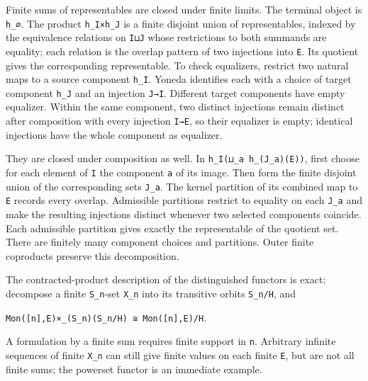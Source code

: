 \documentclass[
  10pt,
]{article}
\begin{document}
Finite sums of representables are closed under finite limits. The
terminal object is \texttt{\small h\_\allowbreak{}∅}. The product
\texttt{\small h\_\allowbreak{}I×h\_\allowbreak{}J} is a finite disjoint
union of representables, indexed by the equivalence relations on
\texttt{\small I⊔J} whose restrictions to both summands are equality;
each relation is the overlap pattern of two injections into
\texttt{\small E}. Its quotient gives the corresponding representable.
To check equalizers, restrict two natural maps to a source component
\texttt{\small h\_\allowbreak{}I}. Yoneda identifies each with a choice
of target component \texttt{\small h\_\allowbreak{}J} and an injection
\texttt{\small J→\allowbreak{}I}. Different target components have empty
equalizer. Within the same component, two distinct injections remain
distinct after composition with every injection
\texttt{\small I→\allowbreak{}E}, so their equalizer is empty; identical
injections have the whole component as equalizer.

They are closed under composition as well. In
\texttt{\small h\_\allowbreak{}I(\allowbreak{}⊔\_\allowbreak{}a h\_\allowbreak{}(\allowbreak{}J\_\allowbreak{}a)\allowbreak{}(\allowbreak{}E)\allowbreak{})\allowbreak{}},
first choose for each element of \texttt{\small I} the component
\texttt{\small a} of its image. Then form the finite disjoint union of
the corresponding sets \texttt{\small J\_\allowbreak{}a}. The kernel
partition of its combined map to \texttt{\small E} records every
overlap. Admissible partitions restrict to equality on each
\texttt{\small J\_\allowbreak{}a} and make the resulting injections
distinct whenever two selected components coincide. Each admissible
partition gives exactly the representable of the quotient set. There are
finitely many component choices and partitions. Outer finite coproducts
preserve this decomposition.

The contracted-product description of the distinguished functors is
exact: decompose a finite \texttt{\small S\_\allowbreak{}n}-set
\texttt{\small X\_\allowbreak{}n} into its transitive orbits
\texttt{\small S\_\allowbreak{}n/\allowbreak{}H}, and

\texttt{\small Mon(\allowbreak{}[\allowbreak{}n]\allowbreak{},\allowbreak{}E)\allowbreak{}×\_\allowbreak{}(\allowbreak{}S\_\allowbreak{}n)\allowbreak{}(\allowbreak{}S\_\allowbreak{}n/\allowbreak{}H)\allowbreak{} ≅ Mon(\allowbreak{}[\allowbreak{}n]\allowbreak{},\allowbreak{}E)\allowbreak{}/\allowbreak{}H}.

A formulation by a finite sum requires finite support in
\texttt{\small n}. Arbitrary infinite sequences of finite
\texttt{\small X\_\allowbreak{}n} can still give finite values on each
finite \texttt{\small E}, but are not all finite sums; the powerset
functor is an immediate example.
\end{document}
